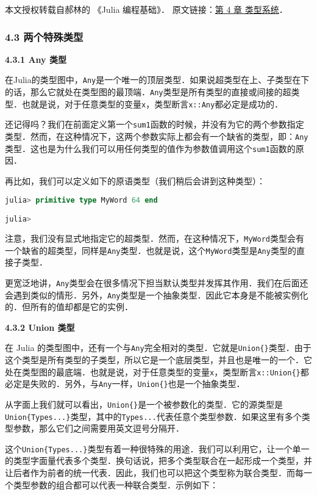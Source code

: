 
本文授权转载自郝林的 《Julia 编程基础》． 原文链接：\href{https://github.com/hyper0x/JuliaBasics/blob/master/book/ch04.md}{第 4 章 类型系统}．


\subsubsection{4.3 两个特殊类型}

\textbf{4.3.1 Any 类型}

在Julia的类型图中，\verb|Any|是一个唯一的顶层类型．如果说超类型在上、子类型在下的话，那么它就处在类型图的最顶端．\verb|Any|类型是所有类型的直接或间接的超类型．也就是说，对于任意类型的变量\verb|x|，类型断言\verb|x::Any|都必定是成功的．

还记得吗？我们在前面定义第一个\verb|sum1|函数的时候，并没有为它的两个参数指定类型．然而，在这种情况下，这两个参数实际上都会有一个缺省的类型，即：\verb|Any|类型．这也是为什么我们可以用任何类型的值作为参数值调用这个\verb|sum1|函数的原因．

再比如，我们可以定义如下的原语类型（我们稍后会讲到这种类型）：

\begin{lstlisting}[language=julia]
julia> primitive type MyWord 64 end

julia> 
\end{lstlisting}

注意，我们没有显式地指定它的超类型．然而，在这种情况下，\verb|MyWord|类型会有一个缺省的超类型，同样是\verb|Any|类型．也就是说，这个\verb|MyWord|类型是\verb|Any|类型的直接子类型．

更宽泛地讲，\verb|Any|类型会在很多情况下担当默认类型并发挥其作用．我们在后面还会遇到类似的情形．另外，\verb|Any|类型是一个抽象类型．因此它本身是不能被实例化的．但所有的值却都是它的实例．

\textbf{4.3.2 Union{} 类型}

在 Julia 的类型图中，还有一个与\verb|Any|完全相对的类型．它就是\verb|Union{}|类型．由于这个类型是所有类型的子类型，所以它是一个底层类型，并且也是唯一的一个．它处在类型图的最底端．也就是说，对于任意类型的变量\verb|x|，类型断言\verb|x::Union{}|都必定是失败的．另外，与\verb|Any|一样，\verb|Union{}|也是一个抽象类型．

从字面上我们就可以看出，\verb|Union{}|是一个被参数化的类型．它的源类型是\verb|Union{Types...}|类型，其中的\verb|Types...|代表任意个类型参数．如果这里有多个类型参数，那么它们之间需要用英文逗号分隔开．

这个\verb|Union{Types...}|类型有着一种很特殊的用途．我们可以利用它，让一个单一的类型字面量代表多个类型．换句话说，把多个类型联合在一起形成一个类型，并让后者作为前者的统一代表．因此，我们也可以把这个类型称为联合类型．而每一个类型参数的组合都可以代表一种联合类型．示例如下：

